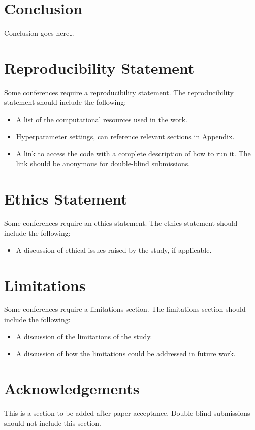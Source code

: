 \section{Conclusion}\label{sec:conclusion}

Conclusion goes here\dots{}


\section{Reproducibility Statement}\label{sec:reproducibility}

Some conferences require a reproducibility statement.
The reproducibility statement
should include the following:
\begin{itemize}
    \item A list of the computational resources used in the work.

    \item Hyperparameter settings,
    can reference relevant sections in Appendix.

    \item A link to access the code
    with a complete description of how to run it.
    The link should be anonymous for double-blind submissions.
\end{itemize}


\section{Ethics Statement}\label{sec:ethics}

Some conferences require an ethics statement.
The ethics statement should include the following:
\begin{itemize}
    \item A discussion of ethical issues raised by the study,
    if applicable.
\end{itemize}


\section{Limitations}\label{sec:limitations}

Some conferences require a limitations section.
The limitations section should include the following:
\begin{itemize}
    \item A discussion of the limitations of the study.
    \item A discussion of how the limitations
    could be addressed in future work.
\end{itemize}


\section*{Acknowledgements}

This is a section to be added after paper acceptance.
Double-blind submissions
should not include this section.

